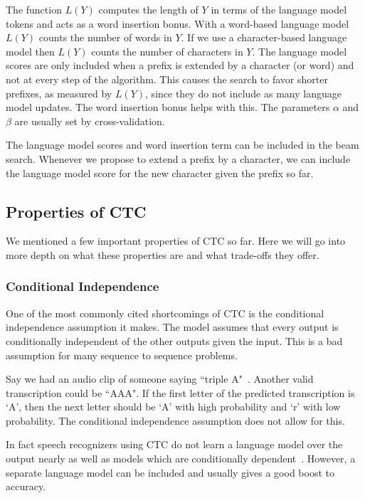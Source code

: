 The function $L(Y)$ computes the length of $Y$ in terms of the language model
tokens and acts as a word insertion bonus. With a word-based language model
$L(Y)$ counts the number of words in $Y$. If we use a character-based language
model then $L(Y)$ counts the number of characters in $Y$. The language model
scores are only included when a prefix is extended by a character (or word) and
not at every step of the algorithm. This causes the search to favor shorter
prefixes, as measured by $L(Y)$, since they do not include as many language
model updates. The word insertion bonus helps with this. The parameters
$\alpha$ and $\beta$ are usually set by cross-validation.

The language model scores and word insertion term can be included in the beam
search. Whenever we propose to extend a prefix by a character, we can include
the language model score for the new character given the prefix so far.

\subsection{Properties of CTC}

We mentioned a few important properties of CTC so far. Here we will go into
more depth on what these properties are and what trade-offs they offer.

\subsubsection{Conditional Independence}

One of the most commonly cited shortcomings of CTC is the conditional
independence assumption it makes. The model assumes that every output is
conditionally independent of the other outputs given the input. This is a bad
assumption for many sequence to sequence problems.

Say we had an audio clip of someone saying ``triple A"~\cite{chan2016}. Another
valid transcription could be ``AAA". If the first letter of the predicted
transcription is `A', then the next letter should be `A' with high probability
and `r' with low probability. The conditional independence assumption does not
allow for this.

In fact speech recognizers using CTC do not learn a language model over the
output nearly as well as models which are conditionally
dependent~\cite{battenberg2017}. However, a separate language model can be
included and usually gives a good boost to accuracy.

